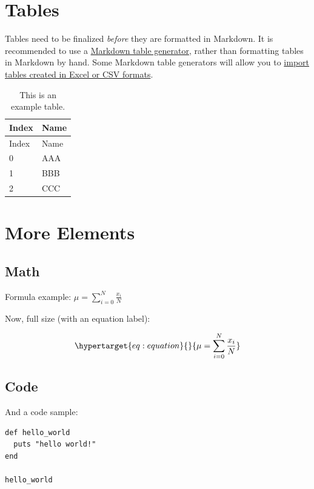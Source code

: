 \documentclass{book}
\begin{document}
\hypertarget{tables}{%
\section{Tables}\label{tables}}

Tables need to be finalized \emph{before} they are formatted in Markdown. It
is recommended to use a
\href{https://www.tablesgenerator.com/markdown_tables}{Markdown table
generator}, rather than formatting tables in Markdown by hand. Some Markdown
table generators will allow you to
\href{https://jakebathman.github.io/Markdown-Table-Generator/}{import tables
created in Excel or CSV formats}.

\begin{longtable}[]{@{}ll@{}}
\caption{This is an example table.}\tabularnewline
\toprule
Index & Name \\
\midrule
\endfirsthead
\toprule
Index & Name \\
\midrule
\endhead
0 & AAA \\
1 & BBB \\
2 & CCC \\
\bottomrule
\end{longtable}

\hypertarget{more-elements}{%
\section{More Elements}\label{more-elements}}

\hypertarget{math-1}{%
\subsection{Math}\label{math-1}}

Formula example: \(\mu = \sum_{i=0}^{N} \frac{x_i}{N}\)

Now, full size (with an equation label):

\begin{equation}\protect\hypertarget{eq:equation}{}{\mu = \sum_{i=0}^{N} \frac{x_i}{N}}\label{eq:equation}\end{equation}

\hypertarget{code}{%
\subsection{Code}\label{code}}

And a code sample:

\begin{verbatim}
def hello_world
  puts "hello world!"
end

hello_world
\end{verbatim}
\end{document}
